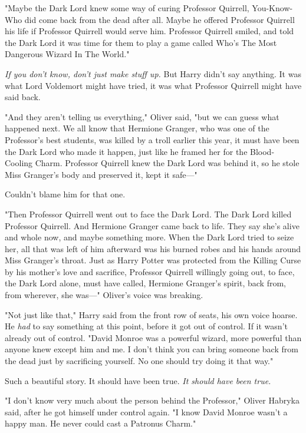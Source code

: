 "Maybe the Dark Lord knew some way of curing Professor Quirrell, You-Know-Who
did come back from the dead after all. Maybe he offered Professor Quirrell his
life if Professor Quirrell would serve him. Professor Quirrell smiled, and told
the Dark Lord it was time for them to play a game called Who's The Most
Dangerous Wizard In The World."

\emph{If you don't know, don't just make stuff up.} But Harry didn't say
anything. It was what Lord Voldemort might have tried, it was what Professor
Quirrell might have said back.

"And they aren't telling us everything," Oliver said, "but we can guess what
happened next. We all know that Hermione Granger, who was one of the
Professor's best students, was killed by a troll earlier this year, it must
have been the Dark Lord who made it happen, just like he framed her for the
Blood-Cooling Charm. Professor Quirrell knew the Dark Lord was behind it, so he
stole Miss Granger's body and preserved it, kept it safe---"

Couldn't blame him for that one.

"Then Professor Quirrell went out to face the Dark Lord. The Dark Lord killed
Professor Quirrell. And Hermione Granger came back to life. They say she's
alive and whole now, and maybe something more. When the Dark Lord tried to
seize her, all that was left of him afterward was his burned robes and his
hands around Miss Granger's throat. Just as Harry Potter was protected from the
Killing Curse by his mother's love and sacrifice, Professor Quirrell willingly
going out, to face, the Dark Lord alone, must have called, Hermione Granger's
spirit, back from, from wherever, she was---" Oliver's voice was breaking.

"Not just like that," Harry said from the front row of seats, his own voice
hoarse. He \emph{had} to say something at this point, before it got out of
control. If it wasn't already out of control. "David Monroe was a powerful
wizard, more powerful than anyone knew except him and me. I don't think you can
bring someone back from the dead just by sacrificing yourself. No one should
try doing it that way."

Such a beautiful story. It should have been true. \emph{It should have been
true.}

"I don't know very much about the person behind the Professor," Oliver Habryka
said, after he got himself under control again. "I know David Monroe wasn't a
happy man. He never could cast a Patronus Charm."

